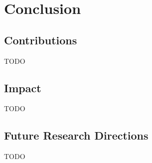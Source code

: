 \section{Conclusion}
\label{sec:conclusion}

\subsection{Contributions}

TODO


\subsection{Impact}

TODO


\subsection{Future Research Directions}

TODO


